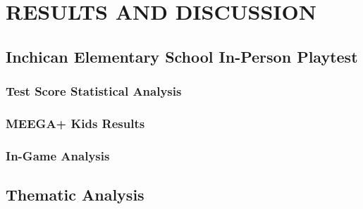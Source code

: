 \chapter{RESULTS AND DISCUSSION}

\section{Inchican Elementary School In-Person Playtest}

\subsection{Test Score Statistical Analysis}


\subsection{MEEGA+ Kids Results}


\subsection{In-Game Analysis}



\section{Thematic Analysis}

